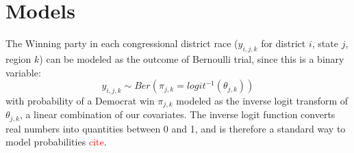 \documentclass[12pt]{article}
\begin{document}
\section{Models}

%
%
%
%

The Winning party in each congressional district race ($y_{i,j,k}$ for district $i$, state $j$, region $k$) can be modeled as the outcome of Bernoulli trial, since this is a binary variable: 
\begin{equation}
	y_{i,j,k} \sim Ber \left( \pi_{j,k} = logit^{-1}(\theta_{j,k})  \right)
\end{equation}
with probability of a Democrat win $\pi_{j,k}$ modeled as the inverse logit transform of $\theta_{j,k}$, a linear combination of our covariates. The inverse logit function converts real numbers into quantities between 0 and 1, and is therefore a standard way to model probabilities \textcolor{red}{cite}.
\end{document}
